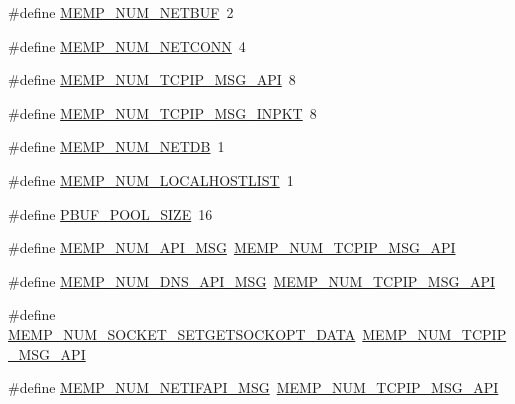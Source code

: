 \begin{DoxyCompactItemize}
\item 
\#define \hyperlink{group__lwip__opts__memp_ga5d99df65869ac101ed6a611fc85016be}{M\+E\+M\+P\+\_\+\+N\+U\+M\+\_\+\+N\+E\+T\+B\+UF}~2
\item 
\#define \hyperlink{group__lwip__opts__memp_gacb40bd726b7e15593b20a628d298f456}{M\+E\+M\+P\+\_\+\+N\+U\+M\+\_\+\+N\+E\+T\+C\+O\+NN}~4
\item 
\#define \hyperlink{group__lwip__opts__memp_gafbbfd6ce8536038cd00fa85bebae987c}{M\+E\+M\+P\+\_\+\+N\+U\+M\+\_\+\+T\+C\+P\+I\+P\+\_\+\+M\+S\+G\+\_\+\+A\+PI}~8
\item 
\#define \hyperlink{group__lwip__opts__memp_gab089a7088439e726c3801ba9e249d831}{M\+E\+M\+P\+\_\+\+N\+U\+M\+\_\+\+T\+C\+P\+I\+P\+\_\+\+M\+S\+G\+\_\+\+I\+N\+P\+KT}~8
\item 
\#define \hyperlink{group__lwip__opts__memp_ga293bc22b60bf3f8e2520f60a88370e7a}{M\+E\+M\+P\+\_\+\+N\+U\+M\+\_\+\+N\+E\+T\+DB}~1
\item 
\#define \hyperlink{group__lwip__opts__memp_gaa9b0f949da12cbe8fe5f7aefc30290e0}{M\+E\+M\+P\+\_\+\+N\+U\+M\+\_\+\+L\+O\+C\+A\+L\+H\+O\+S\+T\+L\+I\+ST}~1
\item 
\#define \hyperlink{group__lwip__opts__memp_ga50eaadc4cad0716410332691e382c38a}{P\+B\+U\+F\+\_\+\+P\+O\+O\+L\+\_\+\+S\+I\+ZE}~16
\item 
\#define \hyperlink{group__lwip__opts__memp_ga5a95abf3610c56e7c23cb035eb9c3444}{M\+E\+M\+P\+\_\+\+N\+U\+M\+\_\+\+A\+P\+I\+\_\+\+M\+SG}~\hyperlink{group__lwip__opts__memp_gafbbfd6ce8536038cd00fa85bebae987c}{M\+E\+M\+P\+\_\+\+N\+U\+M\+\_\+\+T\+C\+P\+I\+P\+\_\+\+M\+S\+G\+\_\+\+A\+PI}
\item 
\#define \hyperlink{group__lwip__opts__memp_ga3b1f228c598529c62895ad04ff294980}{M\+E\+M\+P\+\_\+\+N\+U\+M\+\_\+\+D\+N\+S\+\_\+\+A\+P\+I\+\_\+\+M\+SG}~\hyperlink{group__lwip__opts__memp_gafbbfd6ce8536038cd00fa85bebae987c}{M\+E\+M\+P\+\_\+\+N\+U\+M\+\_\+\+T\+C\+P\+I\+P\+\_\+\+M\+S\+G\+\_\+\+A\+PI}
\item 
\#define \hyperlink{group__lwip__opts__memp_gacf9782dd26bf8a655044dc041a9de948}{M\+E\+M\+P\+\_\+\+N\+U\+M\+\_\+\+S\+O\+C\+K\+E\+T\+\_\+\+S\+E\+T\+G\+E\+T\+S\+O\+C\+K\+O\+P\+T\+\_\+\+D\+A\+TA}~\hyperlink{group__lwip__opts__memp_gafbbfd6ce8536038cd00fa85bebae987c}{M\+E\+M\+P\+\_\+\+N\+U\+M\+\_\+\+T\+C\+P\+I\+P\+\_\+\+M\+S\+G\+\_\+\+A\+PI}
\item 
\#define \hyperlink{group__lwip__opts__memp_gadd5a973b98068ce9318ea2f96b5fa14c}{M\+E\+M\+P\+\_\+\+N\+U\+M\+\_\+\+N\+E\+T\+I\+F\+A\+P\+I\+\_\+\+M\+SG}~\hyperlink{group__lwip__opts__memp_gafbbfd6ce8536038cd00fa85bebae987c}{M\+E\+M\+P\+\_\+\+N\+U\+M\+\_\+\+T\+C\+P\+I\+P\+\_\+\+M\+S\+G\+\_\+\+A\+PI}
\end{DoxyCompactItemize}


